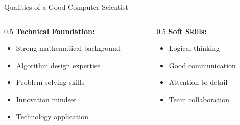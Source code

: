 \documentclass[aspectratio=169]{beamer}
\begin{document}
\begin{frame}{Qualities of a Good Computer Scientist}
  \begin{columns}[T]
    \begin{column}{0.5\textwidth}
      \textbf{Technical Foundation:}
      \begin{itemize}[<+->]
        \item Strong mathematical background
        \item Algorithm design expertise
        \item Problem-solving skills
        \item Innovation mindset
        \item Technology application
      \end{itemize}
    \end{column}
    \begin{column}{0.5\textwidth}
      \textbf{Soft Skills:}
      \begin{itemize}[<+->]
        \item Logical thinking
        \item Good communication
        \item Attention to detail
        \item Team collaboration
      \end{itemize}
    \end{column}
  \end{columns}
  \vspace{0.6cm}
\end{frame}
\end{document}
